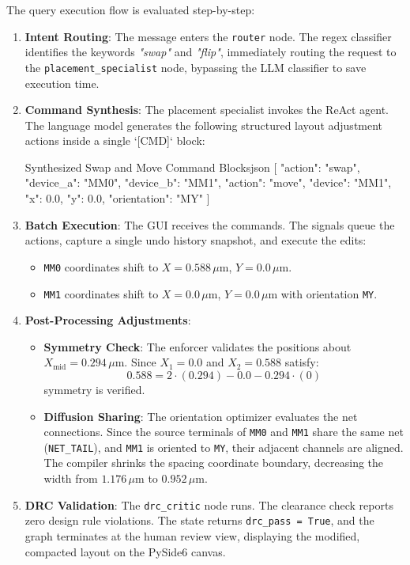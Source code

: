The query execution flow is evaluated step-by-step:
\begin{enumerate}
    \item \textbf{Intent Routing}: The message enters the \texttt{router} node. The regex classifier identifies the keywords \emph{"swap"} and \emph{"flip"}, immediately routing the request to the \texttt{placement\_specialist} node, bypassing the LLM classifier to save execution time.
    \item \textbf{Command Synthesis}: The placement specialist invokes the ReAct agent. The language model generates the following structured layout adjustment actions inside a single `[CMD]` block:
    \begin{thesiscode}{Synthesized Swap and Move Command Blocks}{json}
    [
      {"action": "swap", "device_a": "MM0", "device_b": "MM1"},
      {"action": "move", "device": "MM1", "x": 0.0, "y": 0.0, "orientation": "MY"}
    ]
    \end{thesiscode}
    \item \textbf{Batch Execution}: The GUI receives the commands. The signals queue the actions, capture a single undo history snapshot, and execute the edits:
    \begin{itemize}
        \item \texttt{MM0} coordinates shift to $X = 0.588\,\mu\text{m}$, $Y = 0.0\,\mu\text{m}$.
        \item \texttt{MM1} coordinates shift to $X = 0.0\,\mu\text{m}$, $Y = 0.0\,\mu\text{m}$ with orientation \texttt{MY}.
    \end{itemize}
    \item \textbf{Post-Processing Adjustments}:
    \begin{itemize}
        \item \textbf{Symmetry Check}: The enforcer validates the positions about $X_{\text{mid}} = 0.294\,\mu\text{m}$. Since $X_1 = 0.0$ and $X_2 = 0.588$ satisfy:
        \begin{equation}
            0.588 = 2 \cdot (0.294) - 0.0 - 0.294 \cdot (0)
        \end{equation}
        symmetry is verified.
        \item \textbf{Diffusion Sharing}: The orientation optimizer evaluates the net connections. Since the source terminals of \texttt{MM0} and \texttt{MM1} share the same net (\texttt{NET\_TAIL}), and \texttt{MM1} is oriented to \texttt{MY}, their adjacent channels are aligned. The compiler shrinks the spacing coordinate boundary, decreasing the width from $1.176\,\mu\text{m}$ to $0.952\,\mu\text{m}$.
    \end{itemize}
    \item \textbf{DRC Validation}: The \texttt{drc\_critic} node runs. The clearance check reports zero design rule violations. The state returns \texttt{drc\_pass = True}, and the graph terminates at the human review view, displaying the modified, compacted layout on the PySide6 canvas.
\end{enumerate}

